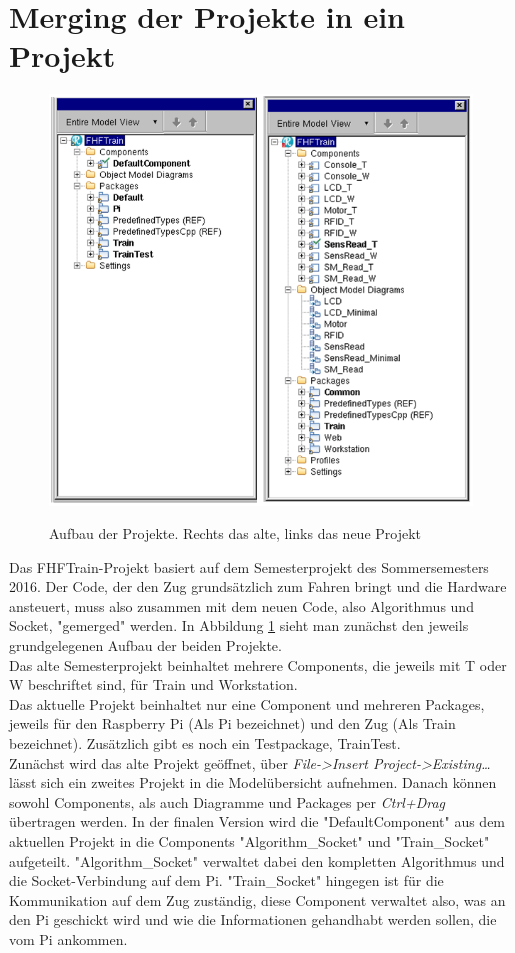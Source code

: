 \section{Merging der Projekte in ein Projekt}
\begin{figure}
	\caption{Aufbau der Projekte. Rechts das alte, links das neue Projekt}
	\includegraphics[width=1\textwidth]{content/pictures/train/structure.png}
	\label{pic:train_structure}
\end{figure}
Das FHFTrain-Projekt basiert auf dem Semesterprojekt des Sommersemesters 2016. Der Code, der den Zug grundsätzlich zum Fahren bringt und die Hardware ansteuert, muss also zusammen mit dem neuen Code, also Algorithmus und Socket, "gemerged" werden. In Abbildung \ref{pic:train_structure} sieht man zunächst den jeweils grundgelegenen Aufbau der beiden Projekte.\\  
Das alte Semesterprojekt beinhaltet mehrere Components, die jeweils mit T oder W beschriftet sind, für Train und Workstation.\\
Das aktuelle Projekt beinhaltet nur eine Component und mehreren Packages, jeweils für den Raspberry Pi (Als Pi bezeichnet) und den Zug (Als Train bezeichnet). Zusätzlich gibt es noch ein Testpackage, TrainTest.\\
Zunächst wird das alte Projekt geöffnet, über \textit{File->Insert Project->Existing…} lässt sich ein zweites Projekt in die Modelübersicht aufnehmen. Danach können sowohl Components, als auch Diagramme und Packages per \textit{Ctrl+Drag} übertragen werden. In der finalen Version wird die "DefaultComponent" aus dem aktuellen Projekt in die Components "Algorithm\_Socket" und "Train\_Socket" aufgeteilt. "Algorithm\_Socket" verwaltet dabei den kompletten Algorithmus und die Socket-Verbindung auf dem Pi. "Train\_Socket" hingegen ist für die Kommunikation auf dem Zug zuständig, diese Component verwaltet also, was an den Pi geschickt wird und wie die Informationen gehandhabt werden sollen, die vom Pi ankommen.\\
